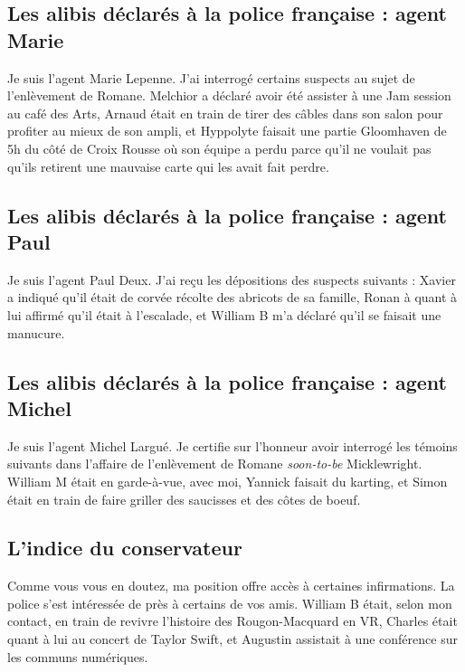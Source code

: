 \documentclass[12pt]{article}
\begin{document}
\subsection{Les alibis déclarés à la police française : agent Marie}

Je suis l'agent Marie Lepenne. J'ai interrogé certains suspects au sujet de l'enlèvement de Romane. Melchior a déclaré avoir été assister à une Jam session au café des Arts, Arnaud était en train de tirer des câbles dans son salon pour profiter au mieux de son ampli, et Hyppolyte faisait une partie Gloomhaven de 5h du côté de Croix Rousse où son équipe a perdu parce qu'il ne voulait pas qu'ils retirent une mauvaise carte qui les avait fait perdre.
 
\subsection{Les alibis déclarés à la police française : agent Paul}

Je suis l'agent Paul Deux. J'ai reçu les dépositions des suspects suivants : Xavier a indiqué qu'il était de corvée récolte des abricots de sa famille, Ronan à quant à lui affirmé qu'il était à l'escalade, et William B m'a déclaré qu'il se faisait une manucure. 

\subsection{Les alibis déclarés à la police française : agent Michel}

Je suis l'agent Michel Largué. Je certifie sur l'honneur avoir interrogé les témoins suivants dans l'affaire de l'enlèvement de Romane {\it soon-to-be} Micklewright.  William M était en garde-à-vue, avec moi, Yannick faisait du karting, et Simon était en train de faire griller des saucisses et des côtes de boeuf.

\subsection{L'indice du conservateur}

Comme vous vous en doutez, ma position offre accès à certaines infirmations. La police s'est intéressée de près à certains de vos amis. William B était, selon mon contact, en train de revivre l'histoire des Rougon-Macquard en VR, Charles était quant à lui au concert de Taylor Swift, et Augustin assistait à une conférence sur les communs numériques. 

\pagebreak
\end{document}
